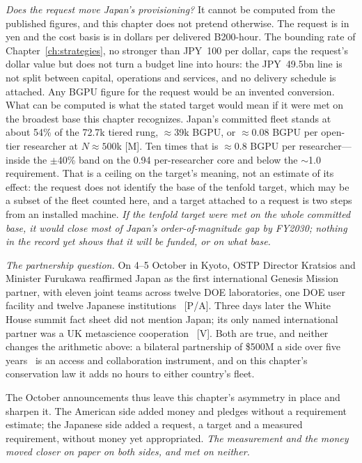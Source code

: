\emph{Does the request move Japan's provisioning?} It cannot be computed from the published figures, and this chapter does not pretend otherwise. The request is in yen and the cost basis is in dollars per delivered B200-hour. The bounding rate of Chapter~\ref{ch:strategies}, no stronger than JPY~100 per dollar, caps the request's dollar value but does not turn a budget line into hours: the JPY~49.5bn line is not split between capital, operations and services, and no delivery schedule is attached. Any BGPU figure for the request would be an invented conversion. What can be computed is what the stated target would mean if it were met on the broadest base this chapter recognizes. Japan's committed fleet stands at about 54\% of the 72.7k tiered rung, $\approx$39k BGPU, or $\approx$0.08 BGPU per open-tier researcher at $N \approx 500$k [M]. Ten times that is $\approx$0.8 BGPU per researcher---inside the $\pm$40\% band on the 0.94 per-researcher core and below the $\sim$1.0 requirement. That is a ceiling on the target's meaning, not an estimate of its effect: the request does not identify the base of the tenfold target, which may be a subset of the fleet counted here, and a target attached to a request is two steps from an installed machine. \emph{If the tenfold target were met on the whole committed base, it would close most of Japan's order-of-magnitude gap by FY2030; nothing in the record yet shows that it will be funded, or on what base.}

\emph{The partnership question.} On 4--5 October in Kyoto, OSTP Director Kratsios and Minister Furukawa reaffirmed Japan as the first international Genesis Mission partner, with eleven joint teams across twelve DOE laboratories, one DOE user facility and twelve Japanese institutions~\cite{gov-japan-us-kyoto} [P/A]. Three days later the White House summit fact sheet did not mention Japan; its only named international partner was a UK metascience cooperation~\cite{sci-wh-summit} [V]. Both are true, and neither changes the arithmetic above: a bilateral partnership of \$500M a side over five years~\cite{genesis-japan} is an access and collaboration instrument, and on this chapter's conservation law it adds no hours to either country's fleet.

The October announcements thus leave this chapter's asymmetry in place and sharpen it. The American side added money and pledges without a requirement estimate; the Japanese side added a request, a target and a measured requirement, without money yet appropriated. \emph{The measurement and the money moved closer on paper on both sides, and met on neither.}

